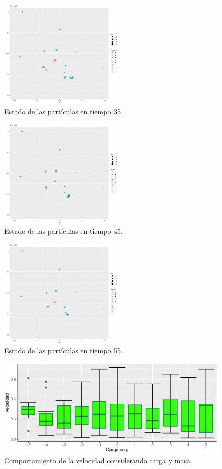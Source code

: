 \documentclass{article}
\begin{document}
\begin{figure}[htb] %
    \centering
    \includegraphics[width=60mm]{p9_t035.png} %
    \caption{Estado de las part\'iculas en tiempo 35.}
    \label{Figura 6}
\end{figure}
\begin{figure}[h!] %
    \centering
    \includegraphics[width=60mm]{p9_t045.png} %
    \caption{Estado de las part\'iculas en tiempo 45.}
    \label{Figura 7}
\end{figure}
\begin{figure}[h!] %
    \centering
    \includegraphics[width=60mm]{p9_t055.png} %
    \caption{Estado de las part\'iculas en tiempo 55.}
    \label{Figura 8}
\end{figure}

\begin{figure}[htb!] %
    \centering
    \includegraphics[width=150mm]{Rplotcarga.eps} %
    \caption{Comportamiento de la velocidad considerando carga y masa.}
    \label{Figura 9}
\end{figure}
\end{document}
